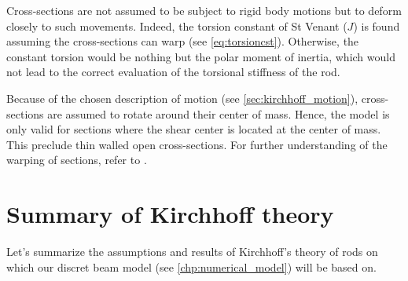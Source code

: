 Cross-sections are not assumed to be subject to rigid body motions but to deform closely to such movements. Indeed, the torsion constant of St Venant ($J$) is found assuming the cross-sections can warp (see \cref{eq:torsioncst}). Otherwise, the constant torsion would be nothing but the polar moment of inertia, which would not lead to the correct evaluation of the torsional stiffness of the rod.

Because of the chosen description of motion (see \cref{sec:kirchhoff_motion}), cross-sections are assumed to rotate around their center of mass. Hence, the model is only valid for sections where the shear center is located at the center of mass. This preclude thin walled open cross-sections. For further understanding of the warping of sections, refer to \cite{Alves2014}.


%
%

%

\clearpage
\section{Summary of Kirchhoff theory}\label{sec:ksummary}
Let's summarize the assumptions and results of Kirchhoff's theory of rods on which our discret beam model (see \cref{chp:numerical_model}) will be based on.

